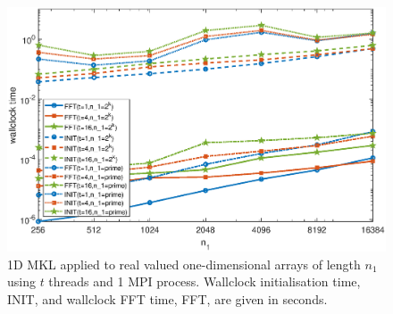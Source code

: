 \documentclass[a4]{article}
\begin{document}
\begin{figure}[!htbp]
\begin{center}
 \includegraphics[width=.9\textwidth, height=0.42\textheight]{FFTW1D_threads_times_fig.eps}
\caption{1D MKL applied to real valued one-dimensional arrays of length $n_1$ using $t$ threads and 1 MPI process. Wallclock initialisation time, INIT, and wallclock FFT time, FFT, are given in seconds.}
\label{Fig:mkl1d_threads_times}
\end{center}
\end{figure}
\end{document}
